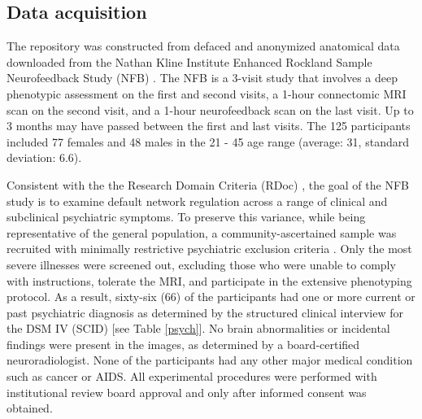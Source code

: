 \subsection*{Data acquisition}

\par The repository was constructed from defaced and anonymized anatomical data downloaded from the Nathan Kline Institute Enhanced Rockland Sample Neurofeedback Study (NFB) \cite{Nooner2012}. The NFB is a 3-visit study that involves a deep phenotypic assessment on the first and second visits, a 1-hour connectomic MRI scan on the second visit, and a 1-hour neurofeedback scan on the last visit. Up to 3 months may have passed between the first and last visits. The 125 participants included 77 females and 48 males in the 21 - 45 age range (average: 31, standard deviation: 6.6). 

Consistent with the the Research Domain Criteria (RDoc) \cite{Insel2010}, the goal of the NFB study is to examine default network regulation across a range of clinical and subclinical psychiatric symptoms. To preserve this variance, while being representative of the general population, a community-ascertained sample was recruited with minimally restrictive psychiatric exclusion criteria \cite{Nooner2012}. Only the most severe illnesses were screened out, excluding those who were unable to comply with instructions, tolerate the MRI, and participate in the extensive phenotyping protocol. As a result, sixty-six (66) of the participants had one or more current or past psychiatric diagnosis as determined by the structured clinical interview for the DSM IV (SCID) \cite{skid} [see Table \ref{psych}]. No brain abnormalities or incidental findings were present in the images, as determined by a board-certified neuroradiologist. None of the participants had any other major medical condition such as cancer or AIDS. All experimental procedures were performed with institutional review board approval and only after informed consent was obtained.

